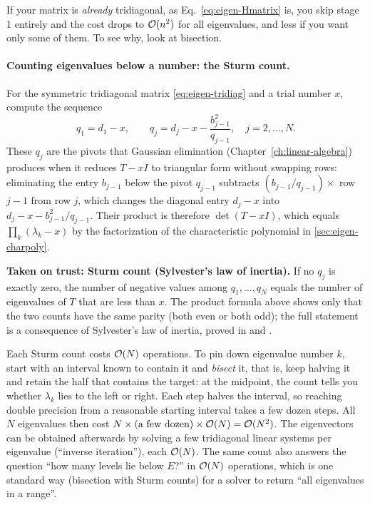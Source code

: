 If your matrix is \emph{already} tridiagonal, as Eq.~\eqref{eq:eigen-Hmatrix} is, you skip stage 1 entirely and the cost drops to $\mathcal{O}(n^2)$ for all eigenvalues, and less if you want only some of them. To see why, look at bisection.

\paragraph{Counting eigenvalues below a number: the Sturm count.} For the symmetric tridiagonal matrix \eqref{eq:eigen-tridiag} and a trial number $x$, compute the sequence
\begin{equation}
q_1=d_1-x,\qquad q_j=d_j-x-\frac{b_{j-1}^2}{q_{j-1}},\quad j=2,\dots,N.
\label{eq:eigen-sturm}
\end{equation}
These $q_j$ are the pivots that Gaussian elimination (Chapter~\ref{ch:linear-algebra}) produces when it reduces $T-xI$ to triangular form without swapping rows: eliminating the entry $b_{j-1}$ below the pivot $q_{j-1}$ subtracts $(b_{j-1}/q_{j-1})\times$ row $j-1$ from row $j$, which changes the diagonal entry $d_j-x$ into $d_j-x-b_{j-1}^2/q_{j-1}$. Their product is therefore $\det(T-xI)$, which equals $\prod_k(\lambda_k-x)$ by the factorization of the characteristic polynomial in \cref{sec:eigen-charpoly}.

\begin{beyond}
\textbf{Taken on trust: Sturm count (Sylvester's law of inertia).} If no $q_j$ is exactly zero, the number of negative values among $q_1,\dots,q_N$ equals the number of eigenvalues of $T$ that are less than $x$. The product formula above shows only that the two counts have the same parity (both even or both odd); the full statement is a consequence of Sylvester's law of inertia, proved in \cite{trefethen} and \cite{nr}.
\end{beyond}

Each Sturm count costs $\mathcal{O}(N)$ operations. To pin down eigenvalue number $k$, start with an interval known to contain it and \emph{bisect} it, that is, keep halving it and retain the half that contains the target: at the midpoint, the count tells you whether $\lambda_k$ lies to the left or right. Each step halves the interval, so reaching double precision from a reasonable starting interval takes a few dozen steps. All $N$ eigenvalues then cost $N\times(\text{a few dozen})\times\mathcal{O}(N)=\mathcal{O}(N^2)$. The eigenvectors can be obtained afterwards by solving a few tridiagonal linear systems per eigenvalue (``inverse iteration''), each $\mathcal{O}(N)$. The same count also answers the question ``how many levels lie below $E$?'' in $\mathcal{O}(N)$ operations, which is one standard way (bisection with Sturm counts) for a solver to return ``all eigenvalues in a range''.


